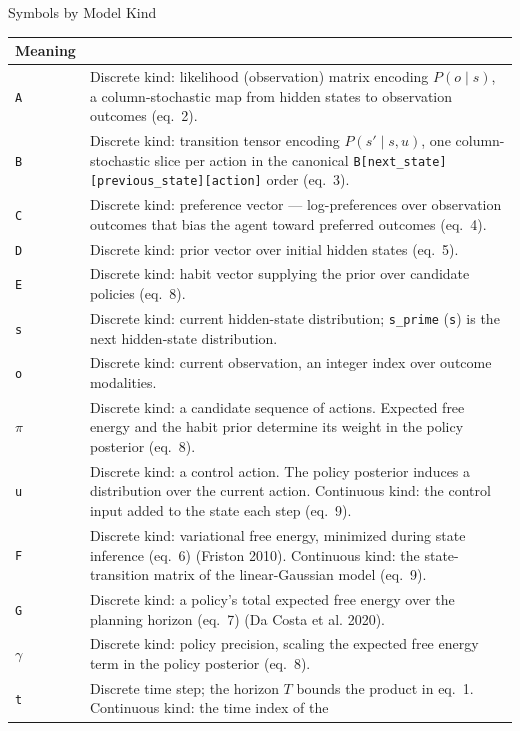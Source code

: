 \documentclass[
  ignorenonframetext,
]{beamer}
\begin{document}
\begin{frame}{Symbols by Model Kind}
\begin{longtable}[]{@{}
  >{\raggedright\arraybackslash}p{}
  >{\raggedright\arraybackslash}p{}@{}}
\begin{minipage}[b]{\linewidth}
M\allowbreak{}e\allowbreak{}a\allowbreak{}n\allowbreak{}i\allowbreak{}n\allowbreak{}g
\end{minipage} \\
\midrule\noalign{}
\endhead
\texttt{A} & Discrete kind: likelihood (observation) matrix encoding
\(P(o \mid s)\), a column-stochastic map from hidden states to
observation outcomes (eq.~2). \\
\texttt{B} & Discrete kind: transition tensor encoding
\(P(s' \mid s, u)\), one column-stochastic slice per action in the
canonical \texttt{B{[}next\_state{]}{[}previous\_state{]}{[}action{]}}
order (eq.~3). \\
\texttt{C} & Discrete kind: preference vector --- log-preferences over
observation outcomes that bias the agent toward preferred outcomes
(eq.~4). \\
\texttt{D} & Discrete kind: prior vector over initial hidden states
(eq.~5). \\
\texttt{E} & Discrete kind: habit vector supplying the prior over
candidate policies (eq.~8). \\
\texttt{s} & Discrete kind: current hidden-state distribution;
\texttt{s\_prime} (\texttt{s\textquotesingle{}}) is the next
hidden-state distribution. \\
\texttt{o} & Discrete kind: current observation, an integer index over
outcome modalities. \\
\texttt{\texorpdfstring{\ensuremath{\pi}}{pi}} & Discrete kind: a candidate sequence of actions. Expected
free energy and the habit prior determine its weight in the policy
posterior (eq.~8). \\
\texttt{u} & Discrete kind: a control action. The policy posterior
induces a distribution over the current action. Continuous kind: the
control input added to the state each step
(eq.~9). \\
\texttt{F} & Discrete kind: variational free energy, minimized during
state inference (eq.~6) (Friston 2010). Continuous kind: the
state-transition matrix of the linear-Gaussian model
(eq.~9). \\
\texttt{G} & Discrete kind: a policy's total expected free energy over
the planning horizon (eq.~7) (Da Costa et al. 2020). \\
\texttt{\texorpdfstring{\ensuremath{\gamma}}{gamma}} & Discrete kind: policy precision, scaling the expected free
energy term in the policy posterior (eq.~8). \\
\texttt{t} & Discrete time step; the horizon \(T\) bounds the product in
eq.~1. Continuous kind: the time index of the

\end{longtable}
\end{frame}
\end{document}
